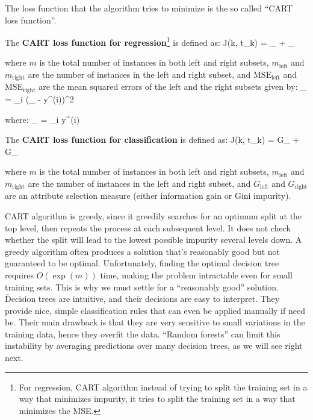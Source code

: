 The loss function that the algorithm tries to minimize is the so called ``CART loss function''.

The \textbf{CART loss function for regression}\footnote{For regression, CART algorithm instead of trying to split the
training set in a way that minimizes impurity, it tries to split the training set in a way that minimizes the MSE\@.}
is defined as:
\bse
J(k, t_{k}) =  _{} + _{}
\ese

where $m$ is the total number of instances in both left and right subsets, $m_{\text{left}}$ and $m_{\text{right}}$ are
the number of instances in the left and right subset, and $\text{MSE}_{\text{left}}$ and $\text{MSE}_{\text{right}}$ are
the mean squared errors of the left and the right subsets given by:
\bse
{}_{} = \sum_{i \in {}} ({}_ - y^{(i)})^2
\ese

where:
\bse
{}_ =  \sum_{i \in {}} y^{(i)}
\ese

The \textbf{CART loss function for classification} is defined as:
\bse
J(k, t_{k}) =  G_{} +  G_{}
\ese

where $m$ is the total number of instances in both left and right subsets, $m_{\text{left}}$ and $m_{\text{right}}$ are
the number of instances in the left and right subset, and $G_{\text{left}}$ and $G_{\text{right}}$ are an attribute
selection measure (either information gain or Gini impurity).
\ed

CART algorithm is greedy, since it greedily searches for an optimum split at the top level, then repeats the process
at each subsequent level. It does not check whether the split will lead to the lowest possible impurity several
levels down. A greedy algorithm often produces a solution that's reasonably good but not guaranteed to be optimal.
Unfortunately, finding the optimal decision tree requires $O(\exp(m))$ time, making the problem intractable even for
small training sets. This is why we must settle for a ``reasonably good'' solution. \v

Decision trees are intuitive, and their decisions are easy to interpret. They provide nice, simple classification
rules that can even be applied manually if need be. Their main drawback is that they are very sensitive to small
variations in the training data, hence they overfit the data. ``Random forests'' can limit this instability by
averaging predictions over many decision trees, as we will see right next.

